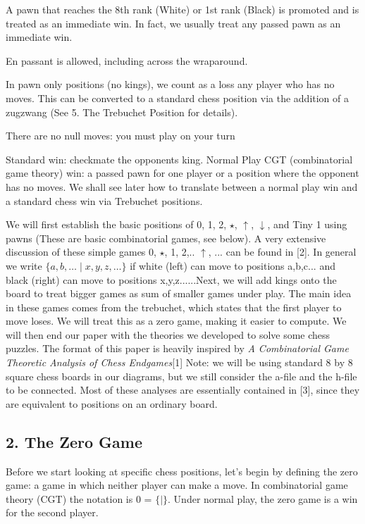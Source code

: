 \documentclass{article}
\begin{document}
\vspace{0.5em}

\indent A pawn that reaches the 8th rank (White) or 1st rank (Black) is promoted and is treated as an immediate win. In fact, we usually treat any passed pawn as an immediate win.

\vspace{0.5em}

\indent En passant is allowed, including across the wraparound.

\vspace{0.5em}

\indent In pawn only positions (no kings), we count as a loss any player who has no moves. This can be converted to a standard chess position via the addition of a zugzwang (See 5. The Trebuchet Position for details).

\vspace{0.5em}

\indent There are no null moves: you must play on your turn

\vspace{0.5em}

\indent Standard win: checkmate the opponents king. Normal Play CGT (combinatorial game theory) win: a passed pawn for one player or a position where the opponent has no moves. We shall see later how to translate between a normal play win and a standard chess win via Trebuchet
positions.


\newpage
\indent We will first establish the basic positions of 0, 1, 2, $ \star $, $ \uparrow $, $ \downarrow $, and Tiny 1 using pawns (These are basic combinatorial games, see below). A very extensive discussion of these simple games 0, $\star$, 1, 2,.. $\uparrow$, ... can be found in [2]. In general we write $\{ a, b, \ldots \mid x, y, z, \ldots \}$ if white (left) can move to positions a,b,c... and black (right) can move to positions x,y,z......Next, we will add kings onto the board to treat bigger games as sum of smaller games under play. The main idea in these games comes from the trebuchet, which states that the first player to move loses. We will treat this as a zero game, making it easier to compute. We will then end our paper with the theories we developed to solve some chess puzzles. The format of this paper is heavily inspired by \textit{A Combinatorial Game Theoretic Analysis of Chess Endgames}[1] Note: we will be using standard 8 by 8 square chess boards in our diagrams, but we still consider the a-file and the h-file to be connected. Most of these analyses are essentially contained in [3], since they are equivalent to positions on an ordinary board.
\begin{center}
\section*{2. The Zero Game}
\end{center}
\indent  \indent Before we start looking at specific chess positions, let’s begin by defining the zero game: a game in which neither player can make a move. In combinatorial game theory (CGT) the notation is 0 = $\{|\}$. Under normal play, the zero game is a win for the second player. 
\end{document}
